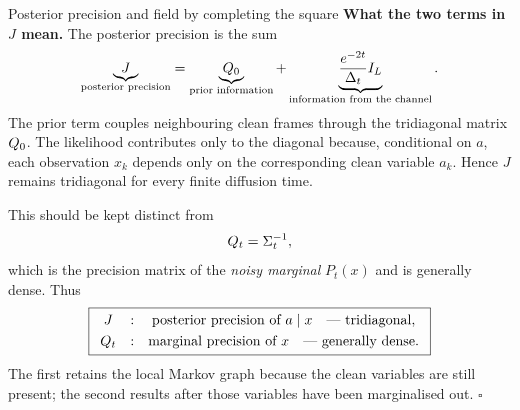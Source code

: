 \begin{toolbox}{Posterior precision and field by completing the square}
\medskip
\noindent\textbf{What the two terms in $J$ mean.}
The posterior precision is the sum
\begin{equation}
  \underbrace{J}_{\text{posterior precision}}
  =
  \underbrace{Q_0}_{\text{prior information}}
  +
  \underbrace{
    \frac{e^{-2t}}{\Delta_t}I_L
  }_{\text{information from the channel}}.
  \label{eq:g-information-addition}
\end{equation}
The prior term couples neighbouring clean frames through the tridiagonal
matrix $Q_0$. The likelihood contributes only to the diagonal because,
conditional on $a$, each observation $x_k$ depends only on the corresponding
clean variable $a_k$. Hence $J$ remains tridiagonal for every finite
diffusion time.

This should be kept distinct from
\[
  Q_t=\Sigma_t^{-1},
\]
which is the precision matrix of the \emph{noisy marginal} $P_t(x)$ and is
generally dense. Thus
\[
  \boxed{
  \begin{array}{ccc}
    J
    &:&
    \text{posterior precision of }a\mid x
    \quad\text{--- tridiagonal},\\[3pt]
    Q_t
    &:&
    \text{marginal precision of }x
    \quad\text{--- generally dense}.
  \end{array}}
\]
The first retains the local Markov graph because the clean variables are
still present; the second results after those variables have been
marginalised out.
\hfill$\square$
\end{toolbox}

